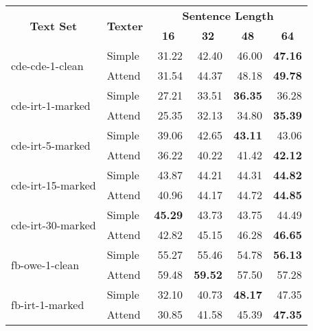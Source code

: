 \begin{tabular}{| l | l | r | r | r | r |}
    \hline

    \multicolumn{1}{|c|}{\multirow{2}{*}{\textbf{Text Set}}} &
    \multicolumn{1}{|c|}{\multirow{2}{*}{\textbf{Texter}}} &
    \multicolumn{4}{|c|}{\textbf{Sentence Length}} \\

    &
    &
    \multicolumn{1}{|c|}{\textbf{16}} &
    \multicolumn{1}{|c|}{\textbf{32}} &
    \multicolumn{1}{|c|}{\textbf{48}} &
    \multicolumn{1}{|c|}{\textbf{64}} \\

    \hline \hline

    \multirow{2}{*}{cde-cde-1-clean}
    & Simple & 31.22 & 42.40 & 46.00 & \textbf{47.16} \\
    & Attend & 31.54 & 44.37 & 48.18 & \textbf{49.78} \\ \hline

    \multirow{2}{*}{cde-irt-1-marked}
    & Simple & 27.21 & 33.51 & \textbf{36.35} & 36.28 \\
    & Attend & 25.35 & 32.13 & 34.80 & \textbf{35.39} \\ \hline

    \multirow{2}{*}{cde-irt-5-marked}
    & Simple & 39.06 & 42.65 & \textbf{43.11} & 43.06 \\
    & Attend & 36.22 & 40.22 & 41.42 & \textbf{42.12} \\ \hline

    \multirow{2}{*}{cde-irt-15-marked}
    & Simple & 43.87 & 44.21 & 44.31 & \textbf{44.82} \\
    & Attend & 40.96 & 44.17 & 44.72 & \textbf{44.85} \\ \hline

    \multirow{2}{*}{cde-irt-30-marked}
    & Simple & \textbf{45.29} & 43.73 & 43.75 & 44.49 \\
    & Attend & 42.82 & 45.15 & 46.28 & \textbf{46.65} \\ \hline \hline

    \multirow{2}{*}{fb-owe-1-clean}
    & Simple & 55.27 & 55.46 & 54.78 & \textbf{56.13} \\
    & Attend & 59.48 & \textbf{59.52} & 57.50 & 57.28 \\ \hline

    \multirow{2}{*}{fb-irt-1-marked}
    & Simple & 32.10 & 40.73 & \textbf{48.17} & 47.35 \\
    & Attend & 30.85 & 41.58 & 45.39 & \textbf{47.35} \\ \hline


\end{tabular}
